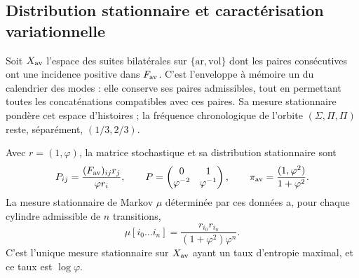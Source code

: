\subsection{Distribution stationnaire et caractérisation variationnelle}
\label{v:v:subsec:parry-explicita}

Soit \(X_{\rm av}\) l’espace des suites bilatérales sur
\(\{\mathrm{ar},\mathrm{vol}\}\) dont les paires consécutives ont une
incidence positive dans \(F_{\rm av}\). C’est l’enveloppe à mémoire un
du calendrier des modes : elle conserve ses paires admissibles, tout en permettant
toutes les concaténations compatibles avec ces paires. Sa mesure
stationnaire pondère cet espace d’histoires ; la fréquence chronologique
de l’orbite \((\Sigma,\Pi,\Pi)\) reste, séparément,
\((1/3,2/3)\).

\begin{proposition}
\label{v:v:prop:parry-explicita}
Avec \(r=(1,\varphi)\), la matrice stochastique et sa distribution
stationnaire sont
\begin{equation}
 P_{ij}=\frac{(F_{\rm av})_{ij}r_j}{\varphi r_i},\qquad
 P=\begin{pmatrix}0&1\\\varphi^{-2}&\varphi^{-1}\end{pmatrix},
 \qquad
 \pi_{\rm av}=\frac{(1,\varphi^2)}{1+\varphi^2}.
 \label{v:v:eq:parry-transicion-estacionaria}
\end{equation}
La mesure stationnaire de Markov \(\mu\) déterminée par ces données
a, pour chaque cylindre admissible de \(n\) transitions,
\begin{equation}
 \mu[i_0\ldots i_n]
 =\frac{r_{i_0}r_{i_n}}{(1+\varphi^2)\varphi^n}.
 \label{v:v:eq:parry-cilindros}
\end{equation}
C’est l’unique mesure stationnaire sur \(X_{\rm av}\) ayant un taux
d’entropie maximal, et ce taux est \(\log\varphi\).
\end{proposition}

